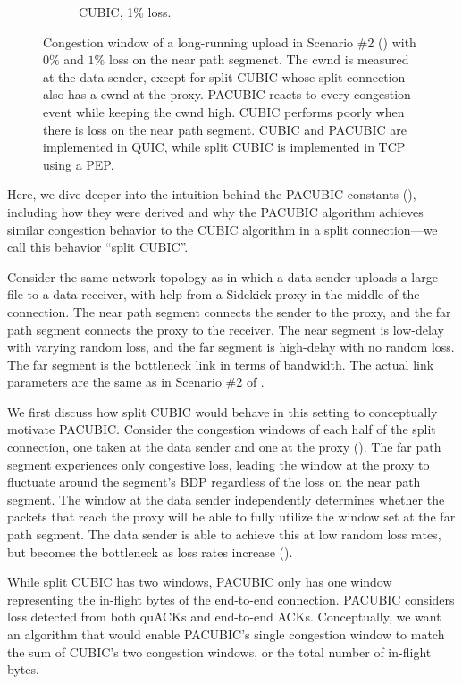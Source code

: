 \begin{figure}[h]
\begin{subfigure}{0.32\linewidth}
  \caption{CUBIC, 1\% loss.}
  \label{fig:time-cwnd:cubic-loss1p}
\end{subfigure}
\caption{Congestion window of a long-running upload in Scenario \#2
() with $0\%$ and $1\%$ loss on the near
path segmenet.
The cwnd is measured at the data sender,
except for split CUBIC whose split connection also has a cwnd at the proxy.
PACUBIC reacts to every congestion event while keeping the cwnd high.
CUBIC performs poorly when there is loss on the near path segment.
CUBIC and PACUBIC are implemented in QUIC, while split CUBIC is implemented
in TCP using a PEP.
}
\label{fig:time-cwnd}
\end{figure}

Here, we dive deeper into the intuition behind the PACUBIC constants
(), including how they were derived and why the PACUBIC
algorithm achieves similar congestion behavior to the CUBIC algorithm in a split
connection---we call this behavior ``split CUBIC''.

Consider the same network topology as  in which a
data sender uploads a large file to a data receiver, with help from a Sidekick
proxy in the middle of the connection. The near path segment connects the sender
to the proxy, and the far path segment connects the proxy to the receiver.
The near segment is low-delay with varying random loss, and the far segment is
high-delay with no random loss. The far segment is the bottleneck link in terms
of bandwidth.
The actual link parameters are the same as in Scenario \#2 of
.

We first discuss how split CUBIC would behave in this setting to conceptually
motivate PACUBIC.
Consider the congestion windows of each half of the
split connection, one taken at the data sender and one at the proxy
().
The far path segment experiences only congestive loss,
leading the window at the proxy to fluctuate around the segment's BDP
regardless of the loss on the near path segment.
The window at the data sender independently determines whether the packets
that reach the proxy will be able to fully utilize the window set at the far
path segment. The data sender is able to achieve this at low random loss rates, but
becomes the bottleneck as loss rates increase ().

While split CUBIC has two windows, PACUBIC only has one
window representing the in-flight bytes of the end-to-end connection.
PACUBIC considers loss detected from both quACKs and end-to-end ACKs.
Conceptually, we want an algorithm that would enable PACUBIC's single
congestion window to match the sum of CUBIC's two congestion windows, or
the total number of in-flight bytes.

